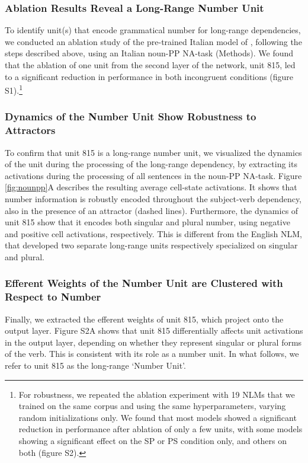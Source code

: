 \subsubsection{Ablation Results Reveal a Long-Range Number Unit} To identify unit(s) that encode grammatical number for long-range dependencies, we conducted an ablation study of the pre-trained Italian model of \citet{Gulordava:etal:2018}, following the steps described above, using an Italian noun-PP NA-task (Methods). We found that the ablation of one unit from the second layer of the network, unit 815, led to a significant reduction in performance in both incongruent conditions (figure S1).\footnote{For robustness, we repeated the ablation experiment with 19 NLMs that we trained on the same corpus and using the same hyperparameters, varying random initializations only. We found that most models showed a significant reduction in performance after ablation of only a few units, with some models showing a significant effect on the SP or PS condition only, and others on both (figure S2).}

\subsubsection{Dynamics of the Number Unit Show Robustness to Attractors} 
To confirm that unit 815 is a long-range number unit, we visualized the dynamics of the unit during the processing of the long-range dependency, by extracting its activations during the processing of all sentences in the noun-PP NA-task. Figure \ref{fig:nounpp}A describes the resulting average cell-state activations. It shows that number information is robustly encoded throughout the subject-verb dependency, also in the presence of an attractor (dashed lines). Furthermore, the dynamics of unit 815 show that it encodes both singular and plural number, using negative and positive cell activations, respectively. This is different from the English NLM, that developed two separate long-range units respectively specialized on singular and plural.

\subsubsection{Efferent Weights of the Number Unit are Clustered with Respect to Number}
Finally, we extracted the efferent weights of unit 815, which project onto the output layer. Figure S2A shows that unit 815 differentially affects unit activations in the output layer, depending on whether they represent singular or plural forms of the verb. This is consistent with its role as a number unit. In what follows, we refer to unit 815 as the long-range `Number Unit'.

